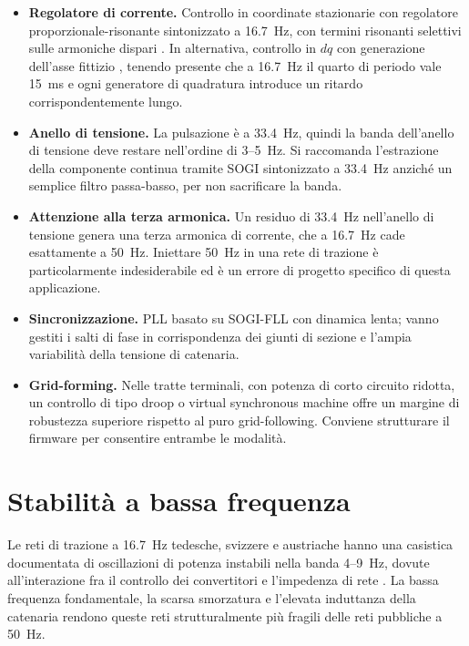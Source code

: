 \documentclass[11pt,a4paper]{article}
\begin{document}
\begin{itemize}
\item \textbf{Regolatore di corrente.} Controllo in coordinate stazionarie con regolatore
proporzionale-risonante sintonizzato a \SI{16.7}{\hertz}, con termini risonanti selettivi
sulle armoniche dispari \cite{zmood2003,teodorescu2011}. In alternativa, controllo in
$dq$ con generazione dell'asse fittizio \cite{bahrani2011}, tenendo presente che a
\SI{16.7}{\hertz} il quarto di periodo vale \SI{15}{\milli\second} e ogni generatore di
quadratura introduce un ritardo corrispondentemente lungo.

\item \textbf{Anello di tensione.} La pulsazione è a \SI{33.4}{\hertz}, quindi la banda
dell'anello di tensione deve restare nell'ordine di \SI{3}{}--\SI{5}{\hertz}. Si
raccomanda l'estrazione della componente continua tramite SOGI sintonizzato a
\SI{33.4}{\hertz} anziché un semplice filtro passa-basso, per non sacrificare la banda.

\item \textbf{Attenzione alla terza armonica.} Un residuo di \SI{33.4}{\hertz}
nell'anello di tensione genera una terza armonica di corrente, che a \SI{16.7}{\hertz}
cade esattamente a \SI{50}{\hertz}. Iniettare \SI{50}{\hertz} in una rete di trazione è
particolarmente indesiderabile ed è un errore di progetto specifico di questa
applicazione.

\item \textbf{Sincronizzazione.} PLL basato su SOGI-FLL con dinamica lenta; vanno
gestiti i salti di fase in corrispondenza dei giunti di sezione e l'ampia variabilità
della tensione di catenaria.

\item \textbf{Grid-forming.} Nelle tratte terminali, con potenza di corto circuito
ridotta, un controllo di tipo droop o virtual synchronous machine \cite{zhong2011} offre
un margine di robustezza superiore rispetto al puro grid-following. Conviene strutturare
il firmware per consentire entrambe le modalità.
\end{itemize}

\section{Stabilità a bassa frequenza}

Le reti di trazione a \SI{16.7}{\hertz} tedesche, svizzere e austriache hanno una
casistica documentata di oscillazioni di potenza instabili nella banda
\SI{4}{}--\SI{9}{\hertz}, dovute all'interazione fra il controllo dei convertitori e
l'impedenza di rete \cite{menth2006,danielsen2010}. La bassa frequenza fondamentale, la
scarsa smorzatura e l'elevata induttanza della catenaria rendono queste reti
strutturalmente più fragili delle reti pubbliche a \SI{50}{\hertz}.
\end{document}
